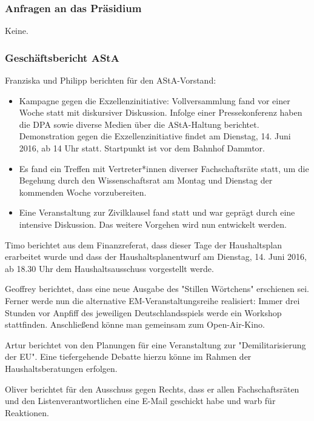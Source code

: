 \documentclass[ngerman,headheight=70pt]{scrartcl}
\begin{document}
    \subsubsection{Anfragen an das Präsidium}

    Keine.

    \subsubsection{Geschäftsbericht AStA}

    Franziska und Philipp berichten für den AStA-Vorstand:
    \begin{itemize}
        \item Kampagne gegen die Exzellenzinitiative: Vollversammlung fand vor
        einer Woche statt mit diskursiver Diskussion. Infolge einer Pressekonferenz
        haben die DPA sowie diverse Medien über die AStA-Haltung berichtet.
        Demonstration gegen die Exzellenzinitiative findet am Dienstag,
        14. Juni 2016, ab 14 Uhr statt. Startpunkt ist vor dem Bahnhof Dammtor.
        \item Es fand ein Treffen mit Vertreter*innen diverser Fachschaftsräte statt,
        um die Begehung durch den Wissenschaftsrat am Montag und Dienstag der
        kommenden Woche vorzubereiten.
        \item Eine Veranstaltung zur Zivilklausel fand statt und war geprägt
        durch eine intensive Diskussion. Das weitere Vorgehen wird nun
        entwickelt werden.
    \end{itemize}

    Timo berichtet aus dem Finanzreferat, dass dieser Tage der Haushaltsplan
    erarbeitet wurde und dass der Haushaltsplanentwurf am Dienstag, 14. Juni 2016,
    ab 18.30 Uhr dem Haushaltsausschuss vorgestellt werde.

    Geoffrey berichtet, dass eine neue Ausgabe des "Stillen Wörtchens" erschienen
    sei. Ferner werde nun die alternative EM-Veranstaltungsreihe realisiert: Immer
    drei Stunden vor Anpfiff des jeweiligen Deutschlandsspiels werde ein Workshop
    stattfinden. Anschließend könne man gemeinsam zum Open-Air-Kino.

    Artur berichtet von den Planungen für eine Veranstaltung zur "Demilitarisierung
    der EU". Eine tiefergehende Debatte hierzu könne im Rahmen der
    Haushaltsberatungen erfolgen.

    Oliver berichtet für den Ausschuss gegen Rechts, dass er allen Fachschaftsräten
    und den Listenverantwortlichen eine E-Mail geschickt habe und warb für
    Reaktionen.
\end{document}
